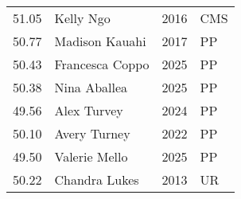\begin{table}[H]
\begin{minipage}[t]{0.48\textwidth}
\begin{tabular}{@{}p{1.8cm}p{2.8cm}p{1.2cm}p{1.4cm}@{}}
    51.05 & Kelly Ngo & 2016 & CMS \\
    50.77 & Madison Kauahi & 2017 & PP \\
    50.43 & Francesca Coppo & 2025 & PP \\
    50.38 & Nina Aballea & 2025 & PP \\
    49.56 & Alex Turvey & 2024 & PP \\
    50.10 & Avery Turney & 2022 & PP \\
    49.50 & Valerie Mello & 2025 & PP \\
    50.22 & Chandra Lukes & 2013 & UR \\
\hline
\end{tabular}
\end{minipage}
\end{table}


